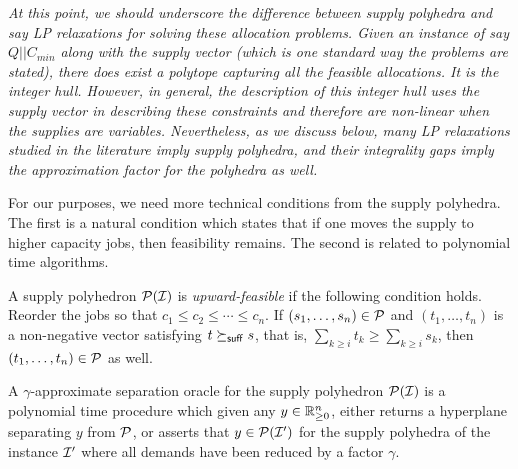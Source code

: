 \begin{remark}\emph{
At this point, we should underscore the difference between supply polyhedra and say LP relaxations for solving  these allocation problems.
Given an instance of say $Q||C_{min}$ {\em along with} the supply vector (which is one standard way the problems are stated), there does exist a polytope capturing all the feasible allocations. It is the integer hull.
However, in general, the description of this integer hull uses the supply vector in describing these constraints and therefore are non-linear when the supplies are variables. Nevertheless, as we discuss below, many LP relaxations
studied in the literature imply supply polyhedra, and their integrality gaps imply the approximation factor for the polyhedra as well.
}
\end{remark}

For our purposes, we need more technical conditions from the supply polyhedra. The first is a natural condition which states that if one moves the supply to higher capacity jobs, then feasibility remains.
The second is related to polynomial time algorithms.

\begin{definition}
	A supply polyhedron ${\cal P}({\cal I})$ is {\em upward-feasible} if the following condition holds.
Reorder the jobs so that $c_1\le c_2 \le \cdots \le c_n$.
		If $(s_1,\ldots,s_n)\in {\cal P}$ and $(t_1,\ldots,t_n)$ is a non-negative vector satisfying $t\succeq_{\mathsf{suff}} s$, that is, $\sum_{k\geq i} t_k \geq \sum_{k\geq i} s_k$, then $(t_1,\ldots,t_n)\in {\cal P}$ as well.
\end{definition}
\begin{definition}
A $\gamma$-approximate separation oracle for the supply polyhedron ${\cal P}({\cal I})$ is a polynomial time procedure which 	given any $y\in \mathbb R^n_{\geq 0}$,  either returns a hyperplane separating $y$ from ${\cal P}$, or asserts that
		$y\in {\cal P}({\cal I}')$ for the supply polyhedra of the instance ${\cal I}'$ where all demands have been reduced by a factor $\gamma$.
\end{definition}
